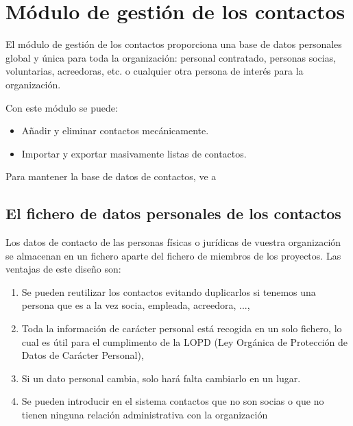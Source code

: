 \chapter{Módulo de gestión de los contactos}

El módulo de gestión de los contactos proporciona una base de datos
personales global y única para toda la organización: personal
contratado, personas socias, voluntarias, acreedoras, etc. o cualquier
otra persona de interés para la organización.

Con este módulo se puede:

\liststyleLvii
\begin{itemize}
\item Añadir y eliminar contactos mecánicamente.
\item Importar y exportar masivamente listas de contactos.
\end{itemize}
Para mantener la base de datos de contactos, ve a

\section{El fichero de datos personales de los contactos}
Los datos de contacto de las personas físicas o jurídicas de vuestra
organización se almacenan en un fichero aparte del fichero de
miembros de los proyectos. Las ventajas de este diseño son:

\liststyleLviii
\begin{enumerate}
\item Se pueden reutilizar los contactos evitando duplicarlos si tenemos
una persona que es a la vez socia, empleada, acreedora, ...,
\item Toda la información de carácter personal está recogida en un
solo fichero, lo cual es útil para el cumplimento de la LOPD (Ley
Orgánica de Protección de Datos de Carácter Personal), 
\item Si un dato personal cambia, solo hará falta cambiarlo en un
lugar.
\item Se pueden introducir en el sistema contactos que no son socias o
que no tienen ninguna relación administrativa con la organización
\end{enumerate}

\bigskip

